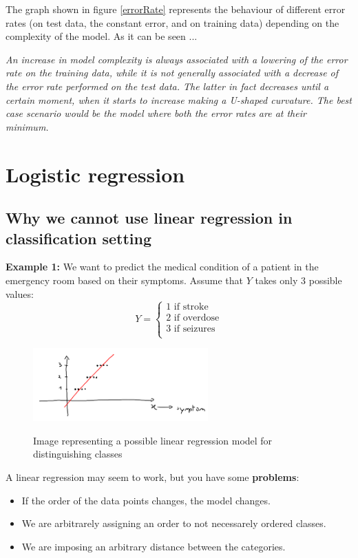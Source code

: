 The graph shown in figure \ref{errorRate} represents the behaviour of different
error rates (on test data, the constant error, and on training data) depending
on the complexity of the model. As it can be seen ... 

\begin{center}
\textit{An increase in model
complexity is always associated with a lowering of the error rate on the
training data, while it is not generally associated with a decrease of the error
rate performed on the test data. The latter in fact decreases until a certain
moment, when it starts to increase making a U-shaped curvature. The best case
scenario would be the model where both the error rates are at their minimum.
}\end{center}


  \section{Logistic regression}
    \subsection{Why we cannot use linear regression in classification setting}
    \textbf{Example 1:} We want to predict the medical condition of a patient in
    the emergency room based on their symptoms. Assume that $Y$ takes only 3
    possible values:
    $$
    Y = \begin{cases}
          1 \text{ if stroke} \\
	      2 \text{ if overdose} \\
	      3 \text{ if seizures} \\
        \end{cases}
    $$

\begin{figure}[H]
\caption{Image representing a possible linear regression model for distinguishing classes}
\centering
\includegraphics[width=0.6\textwidth]{LinearRegForClassification}
\label{}
\end{figure}


    A linear regression may seem to work, but you have some \textbf{problems}:
    \begin{itemize}
      \item If the order of the data points changes, the model changes.
      \item We are arbitrarely assigning an order to not necessarely ordered
      classes.
      \item We are imposing an arbitrary distance between the categories. 
    \end{itemize}

